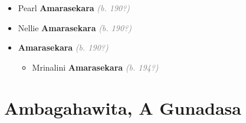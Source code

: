 \documentclass[10pt, openany]{book}
\begin{document}
\begin{itemize}
{\begin{itemize}
{\begin{itemize}
{\begin{itemize}
{\begin{itemize}
{\begin{itemize}
\item{Dharshana Priyantha \textbf{Alagoda} \textcolor{slorange}{\textit{(b. 1971)}} \textcolor{slmaroon}{\textit{Network Analyst (\footnote{\url{https://www.linkedin.com/in/pri-alagoda-4499263/}}).}}
\begin{itemize}
\item{\textit{m.} Harjinder \textbf{Kaur} \textcolor{slorange}{\textit{(b. 1973)}} \textcolor{slmaroon}{\textit{Owner, Legal Minds (\footnote{\url{https://www.linkedin.com/in/harjinder-alagoda-1b180b29/?originalSubdomain=uk}}).}}   \label{couple:00003641:00003675} \begin{itemize}
\item{Raeka \textbf{Alagoda} \textcolor{gray}{\textit{(b. 200?)}}
 }
\end{itemize}}
\end{itemize}
  }
\end{itemize}}
\end{itemize}
 }
\end{itemize}}
\end{itemize}
  }
\item{Pearl \textbf{Amarasekara} \textcolor{gray}{\textit{(b. 190?)}}
 }
\item{Nellie \textbf{Amarasekara} \textcolor{gray}{\textit{(b. 190?)}}
 }
\item{ \textbf{Amarasekara} \textcolor{gray}{\textit{(b. 190?)}}
\begin{itemize}
\item{Mrinalini \textbf{Amarasekara} \textcolor{gray}{\textit{(b. 194?)}}
 }
\end{itemize}
 }
\end{itemize}}
\end{itemize}
  
\part{Ambagahawita, A Gunadasa}
\end{document}
